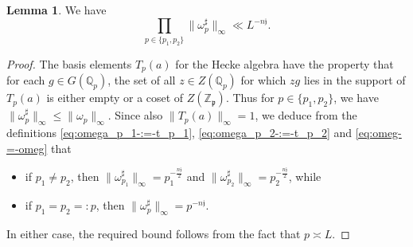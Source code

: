 \documentclass[reqno]{amsart}
\theoremstyle{plain} \newtheorem{theorem} {Theorem}
\theoremstyle{definition} \newtheorem{definition} [theorem] {Definition}
\theoremstyle{itplain} %
\newtheorem{lemma}[theorem]{Lemma}
\numberwithin{equation}{section}
\numberwithin{theorem}{section}
\renewcommand{\leq}{\leqslant}
\begin{document}
\begin{lemma}\label{lem:we-have-begin}
  We have
  \begin{equation*}
    \prod_{p \in \{p_1, p_2\}}
    \|\omega_p ^\sharp \|_{\infty} \ll L^{-n \mathfrak{j}}.
  \end{equation*}
\end{lemma}
\begin{proof}
  The basis elements $T_p(a)$ for the Hecke algebra have the property that for each $g \in G(\mathbb{Q}_p)$, the set of all $z \in Z(\mathbb{Q}_p)$ for which $z g$ lies in the support of $T_p(a)$ is either empty or a coset of $Z(\mathbb{Z}_\mathfrak{p})$.  Thus for $p \in \{p_1, p_2\}$, we have $\|\omega_p ^\sharp \|_{\infty } \leq \|\omega_p\|_{\infty}$.  Since also $\|T_p(a)\|_{\infty} = 1$, we deduce from the definitions \eqref{eq:omega_p_1-:=-t_p_1}, \eqref{eq:omega_p_2-:=-t_p_2} and \eqref{eq:omeg-=-omeg} that
  \begin{itemize}
  \item if $p_1 \neq p_2$, then $\|\omega_{p_1} ^\sharp \|_{\infty} = p_1^{- \frac{n \mathfrak{j}}{2}}$ and $\|\omega_{p_2} ^\sharp \|_{\infty} = p_2^{- \frac{n \mathfrak{j}}{2}}$, while
  \item if $p_1 = p_2 =: p$, then $\|\omega_{p} ^\sharp \|_{\infty} = p^{- n \mathfrak{j}}$.
  \end{itemize}
  In either case, the required bound follows from the fact that $p \asymp L$.
\end{proof}
\end{document}
